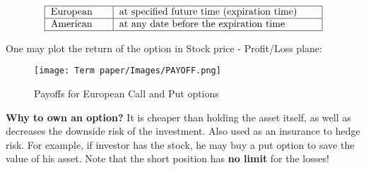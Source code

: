 \documentclass[11pt]{article}
\begin{document}
\[\begin{tabular}{ | m{2cm}| m{7cm} |} 
  \hline
  European & at specified future time (expiration time)\\ 
  \hline
  American & at any date before the expiration time\\ 
  \hline
\end{tabular}\]

One may plot the return of the option in Stock price - Profit/Loss plane:
\begin{figure}[H]
  \centering
  \texttt{[image: Term paper/Images/PAYOFF.png]}
  \caption{Payoffs for European Call and Put options \protect\cite{payoffs}}
  \label{fig:payoff}
\end{figure}


\textbf{Why to own an option?}   It is cheaper than holding the asset itself, as well as decreases the downside risk of the investment.  
Also used as an insurance to hedge risk. For example, if investor has the stock, he may buy a put option to save the value of his asset. 
Note that the short position has \textbf{no limit} for the losses! 

\newpage
\end{document}
